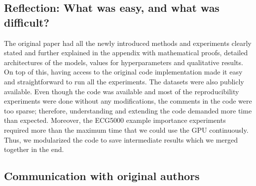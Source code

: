 






\subsection{Reflection: What was easy, and what was difficult?}
The original paper had all the newly introduced methods and experiments clearly stated and further explained in the appendix with mathematical proofs, detailed architectures of the models, values for hyperparameters and qualitative results. On top of this, having access to the original code implementation made it easy and straightforward to run all the experiments. The datasets were also publicly available. Even though the code was available and most of the reproducibility experiments were done without any modifications, the comments in the code were too sparse; therefore, understanding and extending the code demanded more time than expected. Moreover, the ECG5000 example importance experiments required more than the maximum time that we could use the GPU continuously. Thus, we modularized the code to save intermediate results which we merged together in the end.
\subsection{Communication with original authors}

 

